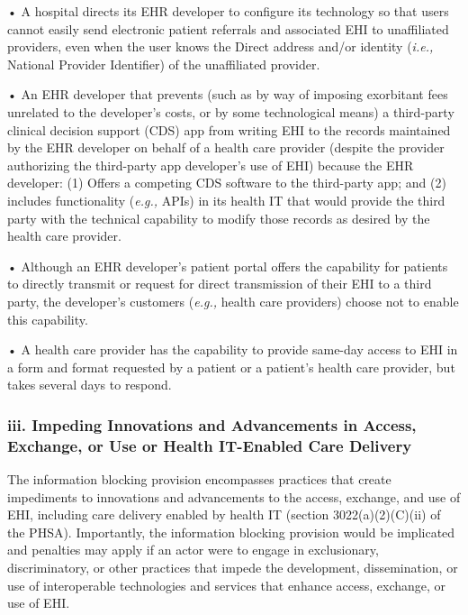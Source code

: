 \documentclass[twoside,11pt]{article}
\begin{document}
          • A hospital directs its EHR developer to configure its technology so that users cannot easily send electronic patient referrals and associated EHI to unaffiliated providers, even when the user knows the Direct address and/or identity (\emph{i.e.,} National Provider Identifier) of the unaffiliated provider.



          • An EHR developer that prevents (such as by way of imposing exorbitant fees unrelated to the developer's costs, or by some technological means) a third-party clinical decision support (CDS) app from writing EHI to the records maintained by the EHR developer on behalf of a health care provider (despite the provider authorizing the third-party app developer's use of EHI) because the EHR developer: (1) Offers a competing CDS software to the third-party app; and (2) includes functionality (\emph{e.g.,} APIs) in its health IT that would provide the third party with the technical capability to modify those records as desired by the health care provider.



          • Although an EHR developer's patient portal offers the capability for patients to directly transmit or request for direct transmission of their EHI to a third party, the developer's customers (\emph{e.g.,} health care providers) choose not to enable this capability.


          • A health care provider has the capability to provide same-day access to EHI in a form and format requested by a patient or a patient's health care provider, but takes several days to respond.


          \subsubsection{iii. Impeding Innovations and Advancements in Access, Exchange, or Use or Health IT-Enabled Care Delivery}

          The information blocking provision encompasses practices that create impediments to innovations and advancements to the access, exchange, and use of EHI, including care delivery enabled by health IT (section 3022(a)(2)(C)(ii) of the PHSA). Importantly, the information blocking provision would be implicated and penalties may apply if an actor were to engage in exclusionary, discriminatory, or other practices that impede the development, dissemination, or use of interoperable technologies and services that enhance access, exchange, or use of EHI.
\end{document}
